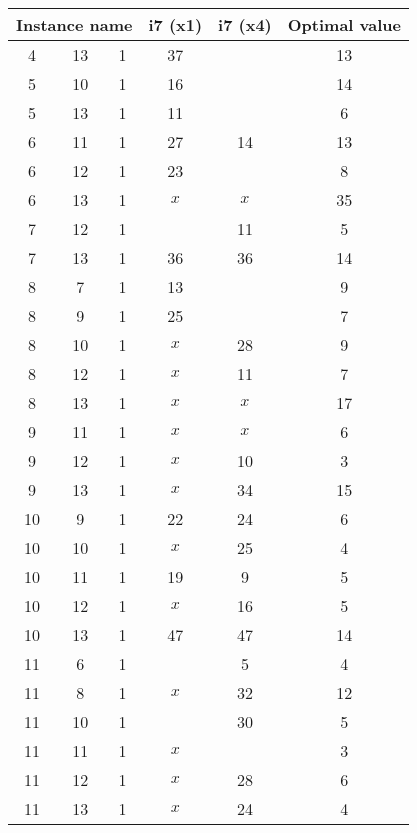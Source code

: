 \begin{table}[H]
\centering
	\begin{tabular}{cccccc}
		\multicolumn{3}{c}{Instance name}
					& i7 (x1)	& i7 (x4)	& Optimal value \\
		\midrule
		 4 & 13 & 1	& 37			& 			& 13 \\
		 5 & 10 & 1	& 16			& 			& 14 \\
		 5 & 13 & 1	& 11			& 			&  6 \\
		 6 & 11 & 1	& 27			& 14			& 13 \\
		 6 & 12 & 1	& 23			& 			&  8 \\
		 6 & 13 & 1	& $x$		& $x$		& 35 \\
		 7 & 12 & 1	& 			& 11			&  5 \\
		 7 & 13 & 1	& 36			& 36			& 14 \\
		 8 &  7 & 1	& 13			& 			&  9 \\
		 8 &  9 & 1	& 25			& 			&  7 \\
		 8 & 10 & 1	& $x$		& 28			&  9 \\
		 8 & 12 & 1	& $x$		& 11			&  7 \\
		 8 & 13 & 1	& $x$		& $x$		& 17 \\
		 9 & 11 & 1	& $x$		& $x$		&  6 \\
		 9 & 12 & 1	& $x$		& 10			&  3 \\
		 9 & 13 & 1	& $x$		& 34			& 15 \\
		10 &  9 & 1	& 22			& 24			&  6 \\
		10 & 10 & 1	& $x$		& 25			&  4 \\
		10 & 11 & 1	& 19			&  9			&  5 \\
		10 & 12 & 1	& $x$		& 16			&  5 \\
		10 & 13 & 1	& 47			& 47			& 14 \\
		11 &  6 & 1	& 			&  5			&  4 \\
		11 &  8 & 1	& $x$		& 32			& 12 \\
		11 & 10 & 1	&  			& 30			&  5 \\
		11 & 11 & 1	& $x$		& 			&  3 \\
		11 & 12 & 1	& $x$		& 28			&  6 \\
		11 & 13 & 1	& $x$		& 24			&  4 \\
	\end{tabular}
	\label{table:LP-results:suboptimalinstances}
\end{table}

